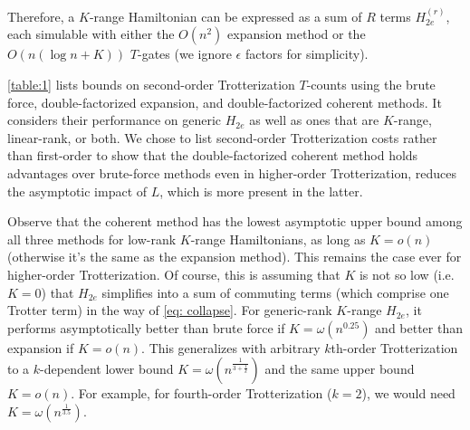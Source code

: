 Therefore, a $K$-range Hamiltonian can be expressed as a sum of $R$ terms $H_{2e}^{(r)}$, each simulable with either the $O(n^2)$ expansion method or the $O(n(\log{n} + K))$ $T$-gates (we ignore $\epsilon$ factors for simplicity).

\ref{table:1} lists bounds on second-order Trotterization $T$-counts using the brute force, double-factorized expansion, and double-factorized coherent methods. It considers their performance on generic $H_{2e}$ as well as ones that are $K$-range, linear-rank, or both. We chose to list second-order Trotterization costs rather than first-order to show that the double-factorized coherent method holds advantages over brute-force methods even in higher-order Trotterization, reduces the asymptotic impact of $L$, which is more present in the latter.

Observe that the coherent method has the lowest asymptotic upper bound among all three methods for low-rank $K$-range Hamiltonians, as long as $K = o(n)$ (otherwise it's the same as the expansion method). This remains the case ever for higher-order Trotterization. Of course, this is assuming that $K$ is not so low (i.e. $K = 0$) that $H_{2e}$ simplifies into a sum of commuting terms (which comprise one Trotter term) in the way of \eqref{eq: collapse}.
For generic-rank $K$-range $H_{2e}$, it performs asymptotically better than brute force if $K = \omega(n^{0.25})$ and better than expansion if $K = o(n)$. This generalizes with arbitrary $k$th-order Trotterization to a $k$-dependent lower bound $K = \omega(n^{\frac{1}{3 + \frac{1}{k}}})$ and the same upper bound $K = o(n)$. For example, for fourth-order Trotterization ($k = 2$), we would need $K = \omega(n^{\frac{1}{3.5}})$.

